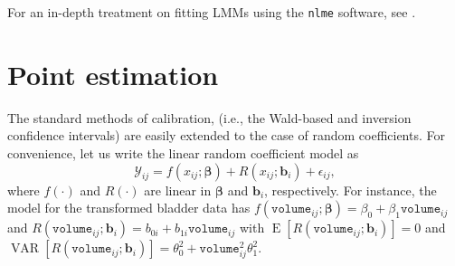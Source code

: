 \documentclass{article}\usepackage[]{graphicx}\usepackage[]{color}
\newcommand{\VAR}{\operatorname{VAR}}
\newcommand{\E}{\operatorname{E}}
\begin{document}
For an in-depth treatment on fitting LMMs using the \texttt{nlme} software, see \citet{pinheiro-mixed-2000}.



\section{Point estimation}\label{sec:point}

The standard methods of calibration, (i.e., the Wald-based and inversion confidence intervals) are easily extended to the case of random coefficients.  For convenience, let us write the linear random coefficient model as
\begin{equation*}
  \mathcal{Y}_{ij} = f\left(x_{ij}; \bm{\beta}\right) + R\left(x_{ij}; \bm{b}_i\right) + \epsilon_{ij},
\end{equation*}
where $f(\cdot)$ and $R(\cdot)$ are linear in $\bm{\beta}$ and $\bm{b}_i$, respectively.  For instance, the model for the transformed bladder data has $f\left(\texttt{volume}_{ij}; \bm{\beta}\right) = \beta_0 + \beta_1 \texttt{volume}_{ij}$ and $R\left(\texttt{volume}_{ij}; \bm{b}_i\right) = b_{0i} + b_{1i}\texttt{volume}_{ij}$ with $\E\left[R\left(\texttt{volume}_{ij}; \bm{b}_i\right)\right] = 0$ and $\VAR\left[R\left(\texttt{volume}_{ij}; \bm{b}_i\right)\right] = \theta_0^2 + \texttt{volume}_{ij}^2\theta_1^2$.
\end{document}
